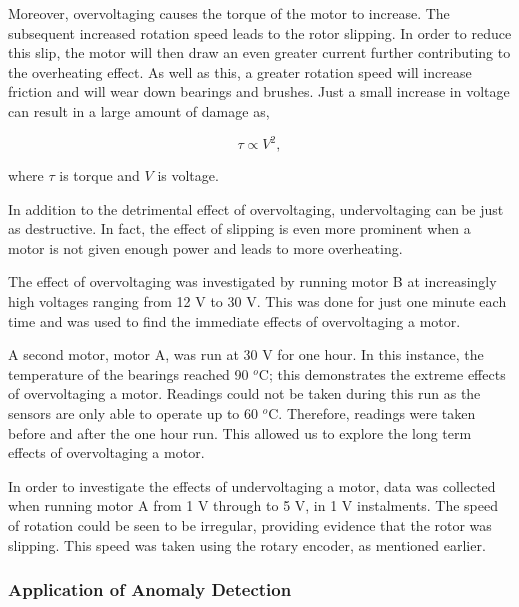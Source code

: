 Moreover, overvoltaging causes the torque of the motor to increase. The subsequent increased rotation speed leads to the rotor slipping. In order to reduce this slip, the motor will then draw an even greater current further contributing to the overheating effect. As well as this, a greater rotation speed will increase friction and will wear down bearings and brushes. Just a small increase in voltage can result in a large amount of damage as,

\begin{equation}
\tau \propto V^2,
\label{Torque}
\end{equation}

where $\tau$ is torque and $V$ is voltage.

In addition to the detrimental effect of overvoltaging, undervoltaging can be just as destructive. In fact, the effect of slipping is even more prominent when a motor is not given enough power and leads to more overheating.


The effect of overvoltaging  was investigated by running motor B at increasingly high voltages ranging from 12 V to 30 V. This was done for just one minute each time and was used to find the immediate effects of overvoltaging a motor.
    

A second motor, motor A, was run at 30 V for one hour. In this instance, the temperature of the bearings reached 90 $^o$C; this demonstrates the extreme effects of overvoltaging a motor. Readings could not be taken during this run as the sensors are only able to operate %
up to 60 $^o$C. %
Therefore, readings were taken before and after the one hour run. This allowed us to explore the long term effects of overvoltaging a motor.


In order to investigate the effects of undervoltaging a motor, data was collected when running motor A from 1 V through to 5 V, in 1 V instalments. The speed of rotation could be seen to be irregular, providing evidence that the rotor was slipping. This speed was taken using the rotary encoder, as mentioned earlier. %


\subsubsection{Application of Anomaly Detection}

